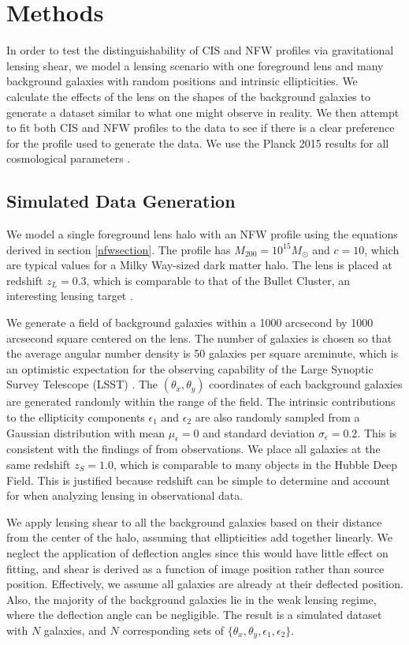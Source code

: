 \documentclass[10pt]{article}
\begin{document}
\section{Methods}
In order to test the distinguishability of CIS and NFW profiles via gravitational lensing shear, we model a lensing scenario with one foreground lens and many background galaxies with random positions and intrinsic ellipticities. We calculate the effects of the lens on the shapes of the background galaxies to generate a dataset similar to what one might observe in reality. We then attempt to fit both CIS and NFW profiles to the data to see if there is a clear preference for the profile used to generate the data. We use the Planck 2015 results for all cosmological parameters \citep{PlanckCollaboration2015}.

\subsection{Simulated Data Generation}
We model a single foreground lens halo with an NFW profile using the equations derived in section \ref{nfwsection}. The profile has $M_{200} = 10^{15} M_\odot$ and $c = 10$, which are typical values for a Milky Way-sized dark matter halo. The lens is placed at redshift $z_L = 0.3$, which is comparable to that of the Bullet Cluster, an interesting lensing target \citep{Clowe2006}.

We generate a field of background galaxies within a 1000 arcsecond by 1000 arcsecond square centered on the lens. The number of galaxies is chosen so that the average angular number density is 50 galaxies per square arcminute, which is an optimistic expectation for the observing capability of the Large Synoptic Survey Telescope (LSST) \citep{Chang2013}. The $(\theta_x, \theta_y)$ coordinates of each background galaxies are generated randomly within the range of the field. The intrinsic contributions to the ellipticity components $\epsilon_1$ and $\epsilon_2$ are also randomly sampled from a Gaussian distribution with mean $\mu_\epsilon = 0$ and standard deviation $\sigma_\epsilon = 0.2$. This is consistent with the findings of \citet{Niemi2015} from observations. We place all galaxies at the same redshift $z_S = 1.0$, which is comparable to many objects in the Hubble Deep Field. This is justified because redshift can be simple to determine and account for when analyzing lensing in observational data.

We apply lensing shear to all the background galaxies based on their distance from the center of the halo, assuming that ellipticities add together linearly. We neglect the application of deflection angles since this would have little effect on fitting, and shear is derived as a function of image position rather than source position. Effectively, we assume all galaxies are already at their deflected position. Also, the majority of the background galaxies lie in the weak lensing regime, where the deflection angle can be negligible. The result is a simulated dataset with $N$ galaxies, and $N$ corresponding sets of  $\{\theta_x, \theta_y, \epsilon_1, \epsilon_2\}$.
\end{document}
